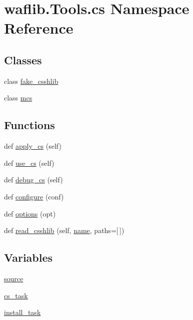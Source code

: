 \hypertarget{namespacewaflib_1_1_tools_1_1cs}{}\section{waflib.\+Tools.\+cs Namespace Reference}
\label{namespacewaflib_1_1_tools_1_1cs}
\subsection*{Classes}
\begin{DoxyCompactItemize}
\item 
class \hyperlink{classwaflib_1_1_tools_1_1cs_1_1fake__csshlib}{fake\+\_\+csshlib}
\item 
class \hyperlink{classwaflib_1_1_tools_1_1cs_1_1mcs}{mcs}
\end{DoxyCompactItemize}
\subsection*{Functions}
\begin{DoxyCompactItemize}
\item 
def \hyperlink{namespacewaflib_1_1_tools_1_1cs_a27e68865096cf54da13a1d0d563bd4c2}{apply\+\_\+cs} (self)
\item 
def \hyperlink{namespacewaflib_1_1_tools_1_1cs_a2962c0e94d37d4610f58b0e4911fbd9f}{use\+\_\+cs} (self)
\item 
def \hyperlink{namespacewaflib_1_1_tools_1_1cs_ae5dd9312be558c0712218cdab22724b4}{debug\+\_\+cs} (self)
\item 
def \hyperlink{namespacewaflib_1_1_tools_1_1cs_a97849d425e4332772dd4982ae091360f}{configure} (conf)
\item 
def \hyperlink{namespacewaflib_1_1_tools_1_1cs_a20f520fa6e5a8eb6b064f7c5c82be0e0}{options} (opt)
\item 
def \hyperlink{namespacewaflib_1_1_tools_1_1cs_aa175024b17365922ae423f6846c3ca7f}{read\+\_\+csshlib} (self, \hyperlink{lib_2expat_8h_a1b49b495b59f9e73205b69ad1a2965b0}{name}, paths=\mbox{[}$\,$\mbox{]})
\end{DoxyCompactItemize}
\subsection*{Variables}
\begin{DoxyCompactItemize}
\item 
\hyperlink{namespacewaflib_1_1_tools_1_1cs_a60fa7099590d96535f62426c3de2b7bd}{source}
\item 
\hyperlink{namespacewaflib_1_1_tools_1_1cs_af7f8d87328d0d0065b91b77818611026}{cs\+\_\+task}
\item 
\hyperlink{namespacewaflib_1_1_tools_1_1cs_a137a86a8fdff7deb27d1ddb94eebdec3}{install\+\_\+task}
\end{DoxyCompactItemize}


